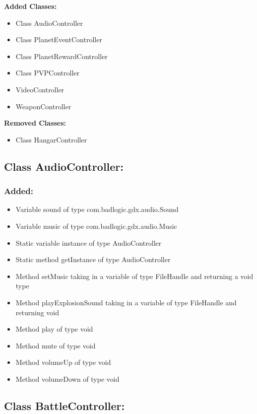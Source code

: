 \documentclass{article}
\begin{document}
\textbf{Added Classes:}
\begin{itemize}
\item Class AudioController
\item Class PlanetEventController
\item Class PlanetRewardController
\item Class PVPController
\item VideoController
\item WeaponController
\end{itemize}

\textbf{Removed Classes:}
\begin{itemize}
\item Class HangarController
\end{itemize}


\subsection{Class AudioController:}

\subsubsection{Added:}
\begin{itemize}
\item Variable sound of type com.badlogic.gdx.audio.Sound
\item Variable music of type com.badlogic.gdx.audio.Music
\item Static variable instance of type AudioController
\item Static method getInstance of type AudioController
\item Method setMusic taking in a variable of type FileHandle and returning a void type
\item Method playExplosionSound taking in a variable of type FileHandle and returning void
\item Method play of type void
\item Method mute of type void
\item Method volumeUp of type void
\item Method volumeDown of type void
\end{itemize}


\subsection{Class BattleController:}
\end{document}
